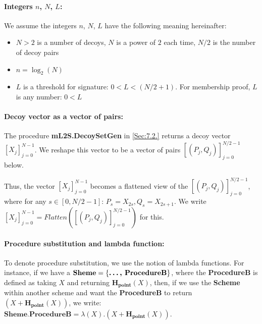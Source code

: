 \documentclass{mathcryptology} %
\newcommand{\Hpoint}{\textbf{H}_{\textbf{point}}}
\newcommand{\Flatten}{\textit{Flatten}}
\theoremstyle{title}
\theoremstyle{titleof}
\begin{document}
\paragraph*{Integers $n$, $N$, $L$:}
    We assume the integers $n$, $N$, $L$ have the following meaning hereinafter:
    \begin{itemize}
        \item $N>2$ is a number of decoys, $N$ is a power of $2$ each time, $N/2$ is the number of decoy pairs
        \item $n=\log_{2}\left(N\right)$
        \item $L$ is a threshold for signature: $0<L<\left(N/2+1\right)$. For membership proof, $L$ is any number: $0<L$
    \end{itemize}

\paragraph*{Decoy vector as a vector of pairs:}
    The procedure \textbf{mL2S.DecoySetGen} in \ref{Sec:7.2.} returns a decoy vector ${\left[X_{j}\right]}_{j=0}^{N-1}$. We reshape this vector to be a vector of pairs ${\left[\left(P_{j}, Q_{j}\right)\right]}_{j=0}^{N/2-1}$ below.

    Thus, the vector ${\left[X_{j}\right]}_{j=0}^{N-1}$ becomes a flattened view of the ${\left[\left(P_{j}, Q_{j}\right)\right]}_{j=0}^{N/2-1}$, where for any $s\in\left[0,N/2-1\right]$: $P_{s} =X_{2s},Q_{s}=X_{2s+1}$. We write ${\left[X_{j}\right]}_{j=0}^{N-1} = \Flatten \left({\left[\left(P_{j},Q_{j}\right)\right]}_{j=0}^{N/2-1}\right)$ for this.

\paragraph*{Procedure substitution and lambda function:}
    To denote procedure substitution, we use the notion of lambda functions. For instance, if we have a $\textbf{Sheme}= \left\{\textbf{\dots, ProcedureB}\right\}$, where the \textbf{ProcedureB} is defined as taking $X$ and returning $\Hpoint\left(X\right)$, then, if we use the \textbf{Scheme} within another scheme and want the \textbf{ProcedureB} to return $\left(X+\Hpoint\left(X\right)\right)$, we write: $\textbf{Sheme.ProcedureB}=\lambda \left(X\right).\left(X+\Hpoint\left(X\right)\right)$.


\end{document}
